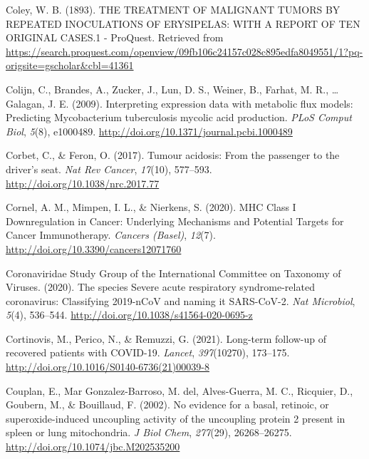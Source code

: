 \documentclass[12pt,twoside,openany,\mydriver]{thesis}  %
\begin{document}
\leavevmode\hypertarget{ref-coley_treatment_1893}{}%
Coley, W. B. (1893). THE TREATMENT OF MALIGNANT TUMORS BY REPEATED INOCULATIONS OF ERYSIPELAS: WITH A REPORT OF TEN ORIGINAL CASES.1 - ProQuest. Retrieved from \url{https://search.proquest.com/openview/09fb106c24157c028c895edfa8049551/1?pq-origsite=gscholar\&cbl=41361}

\leavevmode\hypertarget{ref-colijn_interpreting_2009}{}%
Colijn, C., Brandes, A., Zucker, J., Lun, D. S., Weiner, B., Farhat, M. R., \ldots{} Galagan, J. E. (2009). Interpreting expression data with metabolic flux models: Predicting Mycobacterium tuberculosis mycolic acid production. \emph{PLoS Comput Biol}, \emph{5}(8), e1000489. \url{http://doi.org/10.1371/journal.pcbi.1000489}

\leavevmode\hypertarget{ref-corbet_tumour_2017}{}%
Corbet, C., \& Feron, O. (2017). Tumour acidosis: From the passenger to the driver's seat. \emph{Nat Rev Cancer}, \emph{17}(10), 577--593. \url{http://doi.org/10.1038/nrc.2017.77}

\leavevmode\hypertarget{ref-cornel_mhc_2020}{}%
Cornel, A. M., Mimpen, I. L., \& Nierkens, S. (2020). MHC Class I Downregulation in Cancer: Underlying Mechanisms and Potential Targets for Cancer Immunotherapy. \emph{Cancers (Basel)}, \emph{12}(7). \url{http://doi.org/10.3390/cancers12071760}

\leavevmode\hypertarget{ref-coronaviridae_study_group_of_the_international_committee_on_taxonomy_of_viruses_species_2020}{}%
Coronaviridae Study Group of the International Committee on Taxonomy of Viruses. (2020). The species Severe acute respiratory syndrome-related coronavirus: Classifying 2019-nCoV and naming it SARS-CoV-2. \emph{Nat Microbiol}, \emph{5}(4), 536--544. \url{http://doi.org/10.1038/s41564-020-0695-z}

\leavevmode\hypertarget{ref-cortinovis_long-term_2021}{}%
Cortinovis, M., Perico, N., \& Remuzzi, G. (2021). Long-term follow-up of recovered patients with COVID-19. \emph{Lancet}, \emph{397}(10270), 173--175. \url{http://doi.org/10.1016/S0140-6736(21)00039-8}

\leavevmode\hypertarget{ref-couplan_no_2002}{}%
Couplan, E., Mar Gonzalez-Barroso, M. del, Alves-Guerra, M. C., Ricquier, D., Goubern, M., \& Bouillaud, F. (2002). No evidence for a basal, retinoic, or superoxide-induced uncoupling activity of the uncoupling protein 2 present in spleen or lung mitochondria. \emph{J Biol Chem}, \emph{277}(29), 26268--26275. \url{http://doi.org/10.1074/jbc.M202535200}
\end{document}
